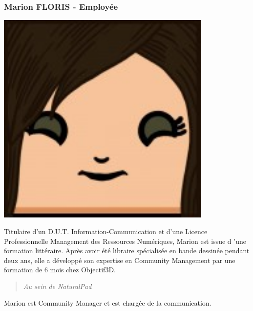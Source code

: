 		\subsubsection*{Marion FLORIS - Employée}
\begin{minipage}[t!]{0.2\linewidth}
\centering
\includegraphics[width=0.8\textwidth]{images/tetocarre/marion}
\end{minipage}
\begin{minipage}[t!]{0.79\linewidth}
Titulaire d’un D.U.T. Information-Communication et d’une Licence Professionnelle Management des Ressources Numériques, Marion est issue d ’une formation littéraire. Après avoir été libraire spécialisée en bande dessinée pendant deux ans, elle a développé son expertise en Community Management par une formation de 6 mois chez Objectif3D.
		\begin{quotation} \emph{Au sein de NaturalPad} \end{quotation}
Marion est Community Manager et est chargée de la communication.
\end{minipage}

